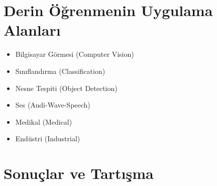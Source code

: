 \documentclass{article}
\begin{document}
\newpage
\section{Derin Öğrenmenin Uygulama Alanları}
\vspace{10pt}
\begin{itemize}
\item Bilgisayar Görmesi (Computer Vision)
\item Sınıflandırma (Classification)
\item Nesne Tespiti (Object Detection)
\item Ses (Audi-Wave-Speech)
\item Medikal (Medical)
\item Endüstri (Industrial)
\end{itemize}

\section{Sonuçlar ve Tartışma}
\end{document}
